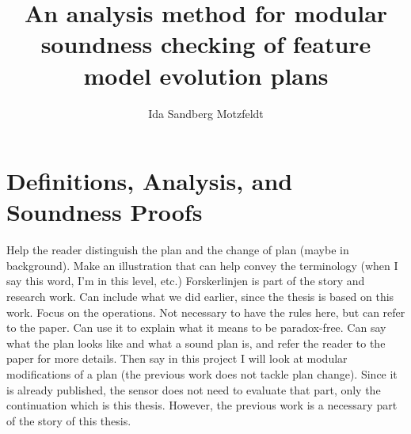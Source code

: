 \documentclass[a4paper,english]{ifimaster}
\title{An analysis method for modular soundness checking of feature model evolution plans}
\author{Ida Sandberg Motzfeldt}
\begin{document}
\duoforside[dept={Department of Informatics},
program={Informatics: Programming and System Architecture},
            option={Software},
long]

\frontmatter{}


\tableofcontents{}
\listoffigures{}

\mainmatter{}



\part{Definitions, Analysis, and Soundness Proofs}

Help the reader distinguish the plan and the change of plan (maybe in background). Make an illustration that can help convey the terminology (when I say this word, I'm in this level, etc.)
Forskerlinjen is part of the story and research work. Can include what we did earlier, since the thesis is based on this work. Focus on the operations. Not necessary to have the rules here, but can refer to the paper. Can use it to explain what it means to be paradox-free. Can say what the plan looks like and what a sound plan is, and refer the reader to the paper for more details. Then say in this project I will look at modular modifications of a plan (the previous work does not tackle plan change). Since it is already published, the sensor does not need to evaluate that part, only the continuation which is this thesis. However, the previous work is a necessary part of the story of this thesis.


 







\backmatter{}

\printbibliography
\end{document}
